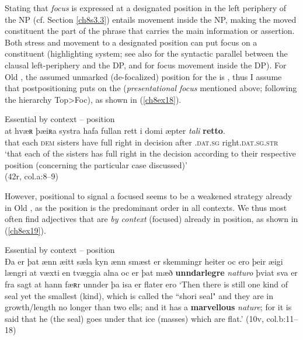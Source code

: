 \documentclass[output=paper,colorlinks,citecolor=brown]{langscibook}
\begin{document}
Stating that \emph{focus} is expressed at a designated position in the
left periphery of the NP (cf. Section \ref{ch8s3.3}) entails movement inside the
NP, making the moved constituent the part of the phrase that carries the main information or assertion. Both stress and movement to a designated position can put focus on a constituent (highlighting system; see also \citealp{Truswell2005} for the syntactic
parallel between the clausal left-periphery and the DP, and for focus
movement inside the DP). For Old , the assumed unmarked
(de-focalized) position for the  is , thus I assume
that postpositioning puts  on the 
(\emph{presentational focus} mentioned above; following the hierarchy
Top\textgreater Foc), as shown in (\ref{ch8ex18}).

\begin{exe}
\ex\label{ch8ex18} Essential by context --  position\\
\gll at hvæʀ þæiʀa systra hafa fullan rett i domi æpter \textit{tali}
\textbf{retto}. \\
that each \textsc{dem} sisters have full right in decision after .\textsc{dat.sg} right.\textsc{dat.sg.str}\\
\glt `that each of the sisters has full right in the decision according to their respective position (concerning the particular case discussed)'\\ (42r, col.a:8--9)
\end{exe}

However, positional  to signal a focused  seems to
be a weakened strategy already in Old , as the 
position is the predominant order in all contexts. We thus most often
find adjectives that are \emph{ by context} (focused) already in
 position, as shown in (\ref{ch8ex19}).

\begin{exe}
\ex\label{ch8ex19}Essential by context --  position\\
Ða er þat ænn æitt sæla kyn ænn smæst er skemmingr heiter oc ero
þeir æigi længri at væxti en tvæggia alna oc er þat mæð
\textbf{unndarlegre} \textit{natturo} þviat sva er fra sagt at hann fæʀr unnder
þa isa er flater ero 
\glt `Then there is still one kind of seal yet the smallest (kind), which is
called the ``shori seal" and they are in growth/length no longer than
two ells; and it has a \textbf{marvellous} \textit{nature}; for it is said that
he (the seal) goes under that ice (masses) which are flat.' (10v, col.b:11--18)
\end{exe}
\end{document}
